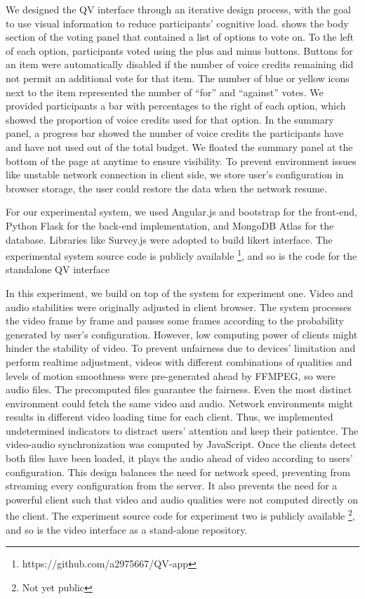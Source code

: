 We designed the QV interface through an iterative design process, with the goal to use visual information to reduce participants' cognitive load.  shows the body section of the voting panel that contained a list of options to vote on. To the left of each option, participants voted using the plus and minus buttons. Buttons for an item were automatically disabled if the number of voice credits remaining did not permit an additional vote for that item. The number of blue or yellow icons next to the item represented the number of ``for'' and ``against'' votes. We provided participants a bar with percentages to the right of each option, which showed the proportion of voice credits used for that option.  In the summary panel, a progress bar showed the number of voice credits the participants have and have not used out of the total budget. We floated the summary panel at the bottom of the page at anytime to ensure visibility. To prevent environment issues like unstable network connection in client side, we store user’s configuration in browser storage, the user could restore the data when the network resume.

For our experimental system, we used Angular.js and bootstrap for the front-end, Python Flask for the back-end implementation, and MongoDB Atlas for the database. Libraries like Survey.js were adopted to build likert interface. The experimental system source code is publicly available \footnote{https://github.com/a2975667/QV-app}, and so is the code for the standalone QV interface

In this experiment, we build on top of the system for experiment one. Video and audio stabilities were originally adjusted in client browser. The system processes the video frame by frame and pauses some frames according to the probability generated by user’s configuration.  However, low computing power of clients might hinder the stability of video. To prevent unfairness due to devices’ limitation and perform realtime adjustment, videos with different combinations of qualities and levels of motion smoothness were pre-generated ahead by FFMPEG, so were audio files. The precomputed files guarantee the fairness. Even the most distinct environment could fetch the same video and audio. Network environments might results in different video loading time for each client. Thus, we implemented undetermined indicators to distract users’ attention and keep their patientce. The video-audio synchronization was computed by JavaScript. Once the clients detect both files have been loaded, it plays the audio ahead of video according to users’ configuration. This design balances the need for network speed, preventing from streaming every configuration from the server. It also prevents the need for a powerful client such that video and audio qualities were not computed directly on the client. The experiment source code for experiment two is publicly available \footnote{Not yet public}, and so is the video interface as a stand-alone repository.
